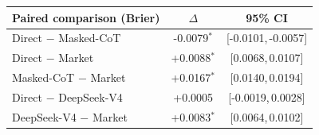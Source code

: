 \begin{tabular}{lcc}
\toprule
Paired comparison (Brier) & $\Delta$ & 95\% CI \\
\midrule
Direct $-$ Masked-CoT & -0.0079$^{\ast}$ & {\scriptsize[-0.0101,\,-0.0057]} \\
Direct $-$ Market & +0.0088$^{\ast}$ & {\scriptsize[0.0068,\,0.0107]} \\
Masked-CoT $-$ Market & +0.0167$^{\ast}$ & {\scriptsize[0.0140,\,0.0194]} \\
Direct $-$ DeepSeek-V4 & +0.0005 & {\scriptsize[-0.0019,\,0.0028]} \\
DeepSeek-V4 $-$ Market & +0.0083$^{\ast}$ & {\scriptsize[0.0064,\,0.0102]} \\
\bottomrule
\end{tabular}
